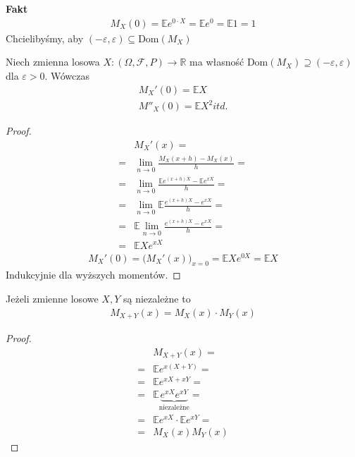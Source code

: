 \textbf{Fakt}\\
\begin{gather*}
M_X(0)=\mathbb E e^{0\cdot X}=\mathbb E e^0=\mathbb E 1=1
\end{gather*}
Chcielibyśmy, aby $ (-\varepsilon,\varepsilon)\subseteq\text{Dom}\left(M_X\right) $
\begin{twr}
Niech zmienna losowa $ X:\left(\Omega,\mathcal F ,P\right) \to \mathbb R $  ma własność Dom$ \left(M_X\right)\supseteq \left(-\varepsilon,\varepsilon\right) $ dla $ \varepsilon>0$. Wówczas
\begin{gather*}
M_X'(0)=\mathbb E X\\
M''_X(0)=\mathbb E X^2
itd.
\end{gather*}
\begin{proof}
\begin{align*}
&M_X'(x)
=\\=&
\lim\limits_{n\to0}\frac{M_X(x+h)-M_X(x)}{h}
=\\=&
\lim\limits_{n\to0}\frac{\mathbb E e^{(x+h)X}-\mathbb E e^{xX}}{h}
=\\=&
\lim\limits_{n\to0}\mathbb E \frac{e^{(x+h)X}-e^{xX}}{h}
=\\=&
\mathbb E \lim\limits_{n\to0}\frac{e^{(x+h)X}-e^{xX}}{h}
=\\=&
\mathbb E Xe^{xX}
\end{align*}
\begin{gather*}
M_X'(0)=\bigl(M_X'(x)\bigr)_{x=0}=\mathbb E Xe^{0X}=\mathbb E X
\end{gather*}
Indukcyjnie dla wyższych momentów.
\end{proof}
\end{twr}
\begin{twr}
Jeżeli zmienne losowe $ X,Y $ są niezależne to
\begin{gather*}
M_{X+Y}(x)=M_X(x)\cdot M_Y(x)
\end{gather*}
\begin{proof}
\begin{align*}
&M_{X+Y}(x)=\\=&
\mathbb E e^{x(X+Y)}
=\\=&
\mathbb E e^{xX+xY}
=\\=&
\mathbb E \underset{\text{niezależne}}{\underbrace{e^{xX}e^{xY}}}
=\\=&
\mathbb E e^{xX}\cdot \mathbb E e^{xY}
=\\=&
M_X(x)M_Y(x)
\end{align*}
\end{proof}
\end{twr}

